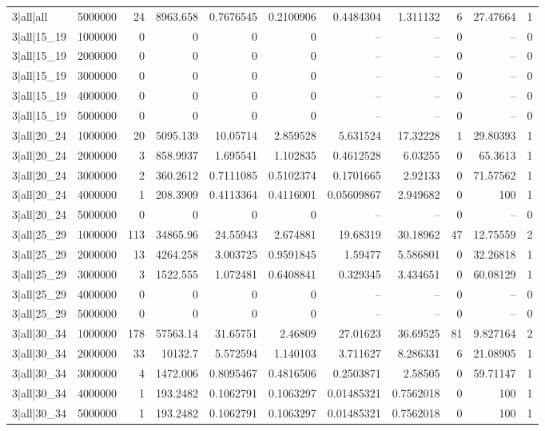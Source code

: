 \begin{tabular}{lrrrrrrrrrr}
3|all|all & 5000000 & 24 & 8963.658 & 0.7676545 & 0.2100906 & 0.4484304 & 1.311132 & 6 & 27.47664 & 1 \\
3|all|15\_19 & 1000000 & 0 & 0 & 0 & 0 & -- & -- & 0 & -- & 0 \\
3|all|15\_19 & 2000000 & 0 & 0 & 0 & 0 & -- & -- & 0 & -- & 0 \\
3|all|15\_19 & 3000000 & 0 & 0 & 0 & 0 & -- & -- & 0 & -- & 0 \\
3|all|15\_19 & 4000000 & 0 & 0 & 0 & 0 & -- & -- & 0 & -- & 0 \\
3|all|15\_19 & 5000000 & 0 & 0 & 0 & 0 & -- & -- & 0 & -- & 0 \\
3|all|20\_24 & 1000000 & 20 & 5095.139 & 10.05714 & 2.859528 & 5.631524 & 17.32228 & 1 & 29.80393 & 1 \\
3|all|20\_24 & 2000000 & 3 & 858.9937 & 1.695541 & 1.102835 & 0.4612528 & 6.03255 & 0 & 65.3613 & 1 \\
3|all|20\_24 & 3000000 & 2 & 360.2612 & 0.7111085 & 0.5102374 & 0.1701665 & 2.92133 & 0 & 71.57562 & 1 \\
3|all|20\_24 & 4000000 & 1 & 208.3909 & 0.4113364 & 0.4116001 & 0.05609867 & 2.949682 & 0 & 100 & 1 \\
3|all|20\_24 & 5000000 & 0 & 0 & 0 & 0 & -- & -- & 0 & -- & 0 \\
3|all|25\_29 & 1000000 & 113 & 34865.96 & 24.55943 & 2.674881 & 19.68319 & 30.18962 & 47 & 12.75559 & 2 \\
3|all|25\_29 & 2000000 & 13 & 4264.258 & 3.003725 & 0.9591845 & 1.59477 & 5.586801 & 0 & 32.26818 & 1 \\
3|all|25\_29 & 3000000 & 3 & 1522.555 & 1.072481 & 0.6408841 & 0.329345 & 3.434651 & 0 & 60.08129 & 1 \\
3|all|25\_29 & 4000000 & 0 & 0 & 0 & 0 & -- & -- & 0 & -- & 0 \\
3|all|25\_29 & 5000000 & 0 & 0 & 0 & 0 & -- & -- & 0 & -- & 0 \\
3|all|30\_34 & 1000000 & 178 & 57563.14 & 31.65751 & 2.46809 & 27.01623 & 36.69525 & 81 & 9.827164 & 2 \\
3|all|30\_34 & 2000000 & 33 & 10132.7 & 5.572594 & 1.140103 & 3.711627 & 8.286331 & 6 & 21.08905 & 1 \\
3|all|30\_34 & 3000000 & 4 & 1472.006 & 0.8095467 & 0.4816506 & 0.2503871 & 2.58505 & 0 & 59.71147 & 1 \\
3|all|30\_34 & 4000000 & 1 & 193.2482 & 0.1062791 & 0.1063297 & 0.01485321 & 0.7562018 & 0 & 100 & 1 \\
3|all|30\_34 & 5000000 & 1 & 193.2482 & 0.1062791 & 0.1063297 & 0.01485321 & 0.7562018 & 0 & 100 & 1 \\

\end{tabular}
